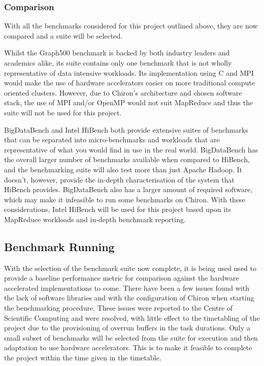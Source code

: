 \documentclass[12pt,a4paper]{article}
\begin{document}
            \subsubsection{Comparison}
            \label{ssub:comparison}

                With all the benchmarks considered for this project outlined above, they are now compared and a suite will be selected.

                Whilst the Graph500 benchmark is backed by both industry leaders and academics alike, its suite contains only one benchmark that is not wholly representative of data intensive workloads. Its implementation using C and MPI would make the use of hardware accelerators easier on more traditional compute oriented clusters. However, due to Chiron's architecture and chosen software stack, the use of MPI and/or OpenMP would not suit MapReduce and thus the suite will not be used for this project.

                BigDataBench and Intel HiBench both provide extensive suites of benchmarks that can be separated into micro-benchmarks and workloads that are representative of what you would find in use in the real world. BigDataBench has the overall larger number of benchmarks available when compared to HiBench, and the benchmarking suite will also test more than just Apache Hadoop. It doesn't, however, provide the in-depth characterisation of the system that HiBench provides. BigDataBench also has a larger amount of required software, which may make it infeasible to run some benchmarks on Chiron. With these considerations, Intel HiBench will be used for this project based upon its MapReduce workloads and in-depth benchmark reporting.
            
        \subsection{Benchmark Running}
        \label{sub:benchmark_running}

            With the selection of the benchmark suite now complete, it is being used used to provide a baseline performance metric for comparison against the hardware accelerated implementations to come. There have been a few issues found with the lack of software libraries and with the configuration of Chiron when starting the benchmarking procedure. These issues were reported to the Centre of Scientific Computing and were resolved, with little effect to the timetabling of the project due to the provisioning of overrun buffers in the task durations. Only a small subset of benchmarks will be selected from the suite for execution and then adaptation to use hardware accelerators. This is to make it feasible to complete the project within the time given in the timetable.
\end{document}
